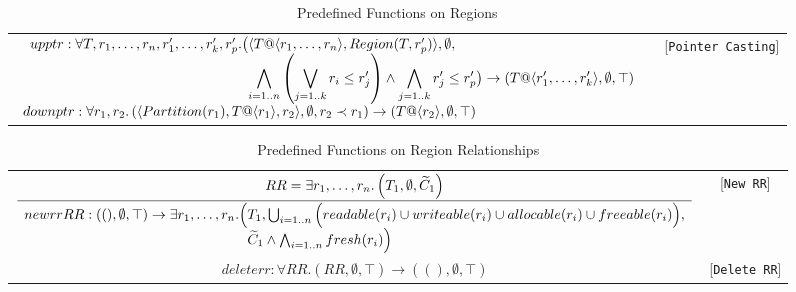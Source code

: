 \documentclass{article}
\newcommand{\infrule}[2]{\displaystyle\frac{\displaystyle\strut{#1}}{\displaystyle\strut {#2}}}
\newcommand{\rtriple}[3]{\left({#1},{#2},{#3}\right)}
\newcommand{\rsingle}[1]{\rtriple{#1}{\emptyset}{\top}}
\begin{document}
\begin{table*}
{\begin{tabular}{cc}
%
%
\begin{math}
\begin{array}{l}
\begin{array}{l@{}l}
upptr : \forall T,r_1,\ldots,r_n,r'_1,\ldots,r'_k,r'_p. \big( & \langle T@\langle r_1, \ldots, r_n \rangle, Region(T, r'_p) \rangle, \emptyset, \\
& \displaystyle\bigwedge_{i = 1..n} \left( \bigvee_{j = 1..k} r_i \le r'_j \right) \wedge \displaystyle\bigwedge_{j = 1..k} r'_j \le r'_p \big) \rightarrow \rsingle{T@\langle r'_1, \ldots, r'_k \rangle}
\end{array} \\
downptr : \forall r_1, r_2. \rtriple{\langle Partition(r_1), T@\langle r_1 \rangle, r_2 \rangle}{\emptyset}{r_2 \prec r_1} \rightarrow \rsingle{T@\langle r_2 \rangle}
\end{array}
\end{math} & [{\tt Pointer Casting}]

\end{tabular}
}
\caption{Predefined Functions on Regions}
\end{table*}

\begin{table*}
\centering
{\small
\begin{tabular}{cc}

%
%
\begin{math}
\infrule{
  RR = \exists r_1, \ldots, r_n. \rtriple{T_1}{\emptyset}{\widetilde{C}_1}
}{
\begin{array}{l@{}l}
  newrr RR : \rsingle{()} \rightarrow \exists r_1, \ldots, r_n. \Big( & T_1, \bigcup_{i = 1..n} \Big( readable(r_i) \cup writeable(r_i) \cup allocable(r_i) \cup freeable(r_i) \Big), \\
 & \widetilde{C}_1 \wedge \bigwedge_{i = 1..n} fresh(r_i) \Big)
\end{array}
}
\end{math} & [{\tt New RR}] \\

%
%
\begin{math}
deleterr : \forall RR. \rsingle{RR} \rightarrow \rsingle{()}
\end{math} & [{\tt Delete RR}] \\
\end{tabular}
}
\caption{Predefined Functions on Region Relationships}
\end{table*}
\end{document}
